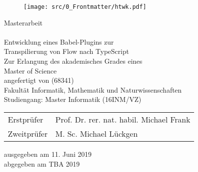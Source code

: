 \makeatletter
\begin{titlepage}
  \vspace{1cm}

  \begin{figure}[h!]
    \centering
    \texttt{[image: src/0\_Frontmatter/htwk.pdf]}
  \end{figure}

  \begin{center}
    \vspace{1cm}

    \begin{onehalfspacing}
      {\Large Masterarbeit} \\[8ex]
      {\huge\textbf{\@title}} \\[5ex]
      {\Large\libertineSB Entwicklung eines Babel-Plugins zur\\Transpilierung von Flow nach TypeScript} \\[8ex]
      \large
      Zur Erlangung des akademisches Grades eines \\
      Master of Science \\[5ex]
      \vfill
      {\libertineSB angefertigt von \@author{ }(68341)}\\[5ex]
      \vfill
      Fakultät Informatik, Mathematik und Naturwissenschaften\\
      Studiengang: Master Informatik (16INM/VZ)\\[5ex]
      \vfill
      \begin{tabular}{ll}
        Erstprüfer & Prof. Dr. rer. nat. habil. Michael Frank \\
        Zweitprüfer & M. Sc. Michael Lückgen \\
      \end{tabular}
      \vspace{5ex}
      \vfill
      ausgegeben am 11. Juni 2019 \\
      abgegeben am TBA 2019
    \end{onehalfspacing}
  \end{center}
\end{titlepage}
\makeatother

